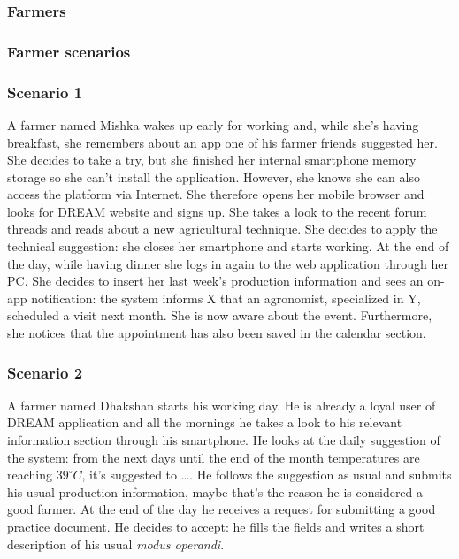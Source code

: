 \newpage





\subsubsection{Farmers}
\subsubsection*{Farmer scenarios}

\subsubsection*{Scenario 1}
A farmer named Mishka wakes up early for working and, while she's having breakfast, she remembers about an app one of his farmer friends suggested her. She decides to take a try, but she finished her internal smartphone memory storage so she can't install the application. However, she knows she can also access the platform via Internet. She therefore opens her mobile browser and looks for DREAM website and signs up. She takes a look to the recent forum threads and reads about a new agricultural technique. She decides to apply the technical suggestion: she closes her smartphone and starts working. At the end of the day, while having dinner she logs in again to the web application through her PC. She decides to insert her last week's production information and sees an on-app notification: the system informs X that an agronomist, specialized in Y, scheduled a visit next month. She is now aware about the event. Furthermore, she notices that the appointment has also been saved in the calendar section.

\subsubsection*{Scenario 2}
A farmer named Dhakshan starts his working day. He is already a loyal user of DREAM application and all the mornings he takes a look to his relevant information section through his smartphone. He looks at the daily suggestion of the system: from the next days until the end of the month temperatures are reaching $39^\circ C$, it's suggested to \ldots. He follows the suggestion as usual and submits his usual production information, maybe that's the reason he is considered a good farmer. At the end of the day he receives a request for submitting a good practice document. He decides to accept: he fills the fields and writes a short description of his usual \textit{modus operandi}.

